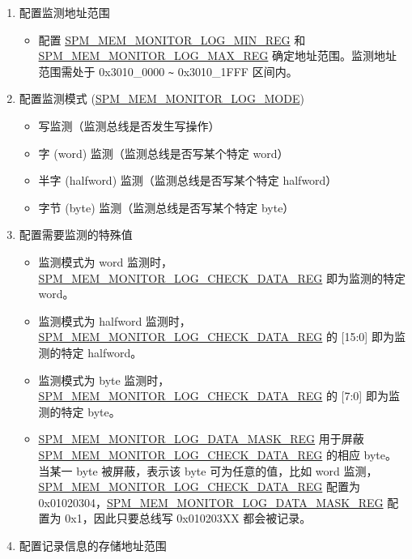 \documentclass[main\_\_CN.tex]{subfiles}
\begin{document}
\begin{enumerate}
    \item 配置监测地址范围
        \begin{itemize}
            \item 配置 \hyperref[regdesc:SPMMEMMONITORLOGMINREG]{SPM\_MEM\_MONITOR\_LOG\_MIN\_REG} 和 \hyperref[regdesc:SPMMEMMONITORLOGMAXREG]{SPM\_MEM\_MONITOR\_LOG\_MAX\_REG} 确定地址范围。监测地址范围需处于 0x3010\_0000 \verb+~+ 0x3010\_1FFF 区间内。
        \end{itemize}
    \item 配置监测模式 (\hyperref[fielddesc:SPMMEMMONITORLOGMODE]{SPM\_MEM\_MONITOR\_LOG\_MODE})
       \begin{itemize}
            \item 写监测（监测总线是否发生写操作）
           \item 字 (word) 监测（监测总线是否写某个特定 word）
           \item 半字 (halfword) 监测（监测总线是否写某个特定 halfword）
           \item 字节 (byte) 监测（监测总线是否写某个特定 byte）
       \end{itemize}
    \item 配置需要监测的特殊值
        \begin{itemize}
            \item 监测模式为 word 监测时，\hyperref[regdesc:SPMMEMMONITORLOGCHECKDATAREG]{SPM\_MEM\_MONITOR\_LOG\_CHECK\_DATA\_REG} 即为监测的特定 word。
            \item 监测模式为 halfword 监测时，\hyperref[regdesc:SPMMEMMONITORLOGCHECKDATAREG]{SPM\_MEM\_MONITOR\_LOG\_CHECK\_DATA\_REG} 的 [15:0] 即为监测的特定 halfword。
            \item 监测模式为 byte 监测时，\hyperref[regdesc:SPMMEMMONITORLOGCHECKDATAREG]{SPM\_MEM\_MONITOR\_LOG\_CHECK\_DATA\_REG} 的 [7:0] 即为监测的特定 byte。
            \item \hyperref[regdesc:SPMMEMMONITORLOGDATAMASKREG]{SPM\_MEM\_MONITOR\_LOG\_DATA\_MASK\_REG} 用于屏蔽 \hyperref[regdesc:SPMMEMMONITORLOGCHECKDATAREG]{SPM\_MEM\_MONITOR\_LOG\_CHECK\_DATA\_REG} 的相应 byte。当某一 byte 被屏蔽，表示该 byte 可为任意的值，比如 word 监测，\hyperref[regdesc:SPMMEMMONITORLOGCHECKDATAREG]{SPM\_MEM\_MONITOR\_LOG\_CHECK\_DATA\_REG} 配置为 0x01020304，\hyperref[regdesc:SPMMEMMONITORLOGDATAMASKREG]{SPM\_MEM\_MONITOR\_LOG\_DATA\_MASK\_REG} 配置为 0x1，因此只要总线写 0x010203XX 都会被记录。
        \end{itemize}
    \item 配置记录信息的存储地址范围

\end{enumerate}
\end{document}
